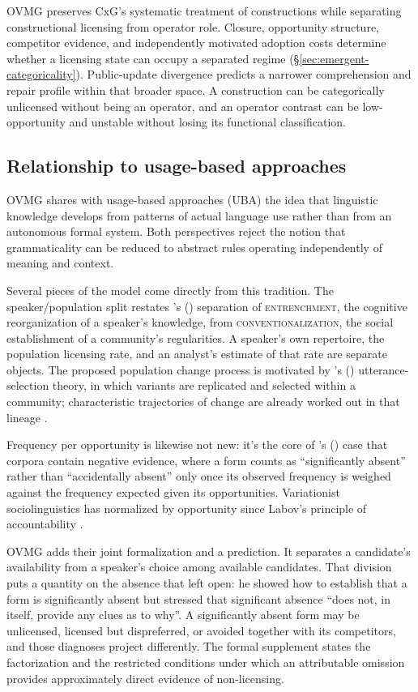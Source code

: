 \documentclass[12pt,letterpaper]{article}
\newcommand{\term}[1]{\textsc{#1}}
\newcommand{\posscite}[1]{\citeauthor{#1}'s (\citeyear{#1})}
\begin{document}
OVMG preserves CxG's systematic treatment of constructions while separating constructional licensing from operator role. Closure, opportunity structure, competitor evidence, and independently motivated adoption costs determine whether a licensing state can occupy a separated regime (\S\ref{sec:emergent-categoricality}). Public-update divergence predicts a narrower comprehension and repair profile within that broader space. A construction can be categorically unlicensed without being an operator, and an operator contrast can be low-opportunity and unstable without losing its functional classification.

\subsection{Relationship to usage-based approaches}\label{sec:usage-based}

OVMG shares with usage-based approaches (UBA) \autocite{bybee2006, bybee2007frequency, bybee2010} the idea that linguistic knowledge develops from patterns of actual language use rather than from an autonomous formal system. Both perspectives reject the notion that grammaticality can be reduced to abstract rules operating independently of meaning and context.

Several pieces of the model come directly from this tradition. The
speaker/population split restates \posscite{schmid2020} separation of
\term{entrenchment}, the cognitive reorganization of a speaker's knowledge, from
\term{conventionalization}, the social establishment of a community's
regularities. A speaker's own repertoire, the population licensing rate, and an
analyst's estimate of that rate are separate objects. The proposed
population change process is motivated by \posscite{croft2000}
utterance-selection theory, in which variants are replicated and selected
within a community; characteristic trajectories of change are already worked
out in that lineage \autocite{BlytheCroft2012}.

Frequency per opportunity is likewise not new: it's the core of
\posscite{Stefanowitsch_2006_NegativeEvidence} case that corpora contain
negative evidence, where a form counts as \enquote{significantly absent} rather
than \enquote{accidentally absent} only once its observed frequency is weighed
against the frequency expected given its opportunities. Variationist
sociolinguistics has normalized by opportunity since Labov's principle of
accountability \autocite{labov1972}.

OVMG adds their joint formalization and a prediction. It separates a candidate's
availability from a speaker's choice among available candidates. That division
puts a quantity on the absence that
\citeauthor{Stefanowitsch_2006_NegativeEvidence} left open: he showed how to
establish that a form is significantly absent but stressed that significant
absence \enquote{does not, in itself, provide any clues as to why}. A
significantly absent form may be unlicensed, licensed but dispreferred, or
avoided together with its competitors, and those diagnoses project differently.
The formal supplement states the factorization and the restricted conditions
under which an attributable omission provides approximately direct evidence of
non-licensing.
\end{document}
